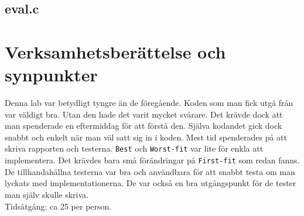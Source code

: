 \documentclass[a4paper]{article}
\begin{document}
\subsection*{eval.c}


\section*{Verksamhetsberättelse och synpunkter}
Denna lab var betydligt tyngre än de föregående. Koden som man fick utgå från var väldigt bra. Utan den hade det varit mycket svårare. Det krävde dock att man spenderade en eftermiddag för att förstå den. Själva kodandet gick dock snabbt och enkelt när man väl satt sig in i koden. Mest tid spenderades på att skriva rapporten och testerna. \texttt{Best} och \texttt{Worst-fit} var lite för enkla att implementera. Det krävdes bara små förändringar på \texttt{First-fit} som redan fanns.
\\
De tillhandahållna testerna var bra och användbara för att snabbt testa om man lyckats med implementationerna. De var också en bra utgångspunkt för de tester man själv skulle skriva.
\\
Tidsåtgång: ca 25 per person.
\end{document}
